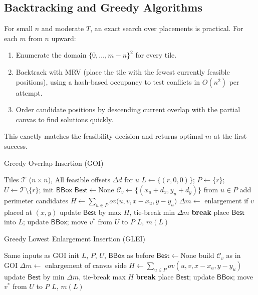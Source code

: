 \documentclass[11pt]{article}
\begin{document}
\subsection{Backtracking and Greedy Algorithms}
For small $n$ and moderate $T$, an exact search over placements is practical. For each $m$ from $n$ upward:
\begin{enumerate}[label=(\roman*)]
  \item Enumerate the domain $\{0,\dots,m-n\}^2$ for every tile.
  \item Backtrack with MRV (place the tile with the fewest currently feasible positions), using a hash-based occupancy to test conflicts in $O(n^2)$ per attempt.
  \item Order candidate positions by descending current overlap with the partial canvas to find solutions quickly.
\end{enumerate}
This exactly matches the feasibility decision and returns optimal $m$ at the first success.

\begin{algorithm}[H]
\caption{Greedy Overlap Insertion (GOI)}
\begin{algorithmic}[1]
\Require Tiles $\mathcal{T}$ ($n\times n$), All feasible offsets $\Delta d$ for $u$
\State $L \gets \{(r,0,0)\}$; $P\gets\{r\}$; $U\gets\mathcal{T}\setminus\{r\}$; init $\mathsf{BBox}$
  \State $\mathsf{Best}\gets\text{None}$
     \State $\mathcal{C}_v \gets \{(x_u+d_x, y_u+d_y)\}$ from $u\in P$
      add perimeter candidates \EndIf
           \State $H \gets \sum_{u\in P} ov\big(u,v,x-x_u,y-y_u\big)$
           \State $\Delta m \gets$ enlargement if $v$ placed at $(x,y)$
           \State update $\mathsf{Best}$ by max $H$, tie-break min $\Delta m$
        \EndIf
     \EndFor
  \EndFor
   \textbf{break} \EndIf
  \State place $\mathsf{Best}$ into $L$; update $\mathsf{BBox}$; move $v^*$ from $U$ to $P$
\EndWhile
\State \Return $L$, $m(L)$
\end{algorithmic}
\end{algorithm}

\begin{algorithm}[H]
\caption{Greedy Lowest Enlargement Insertion (GLEI)}
\begin{algorithmic}[1]
\Require Same inputs as GOI
\State init $L$, $P$, $U$, $\mathsf{BBox}$ as before
  \State $\mathsf{Best}\gets\text{None}$
     \State build $\mathcal{C}_v$ as in GOI
           \State $\Delta m \gets$ enlargement of canvas side
           \State $H \gets \sum_{u\in P} ov(u,v,x-x_u,y-y_u)$
           \State update $\mathsf{Best}$ by min $\Delta m$, tie-break max $H$
        \EndIf
     \EndFor
  \EndFor
   \textbf{break} \EndIf
  \State place $\mathsf{Best}$; update $\mathsf{BBox}$; move $v^*$ from $U$ to $P$
\EndWhile
\State \Return $L$, $m(L)$
\end{algorithmic}
\end{algorithm}
\end{document}
